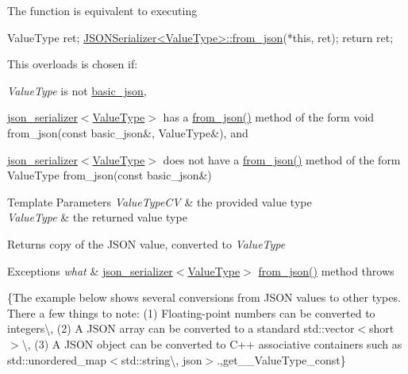 The function is equivalent to executing 
\begin{DoxyCode}
ValueType ret;
\hyperlink{namespacenlohmann_1_1anonymous__namespace_02from__json_8hpp_03_a8da2cbc27f4ff99aff5c20428fbcce4c}{JSONSerializer<ValueType>::from\_json}(*\textcolor{keyword}{this}, ret);
\textcolor{keywordflow}{return} ret;
\end{DoxyCode}


This overloads is chosen if\+:
\begin{DoxyItemize}
\item {\itshape Value\+Type} is not \hyperlink{classnlohmann_1_1basic__json}{basic\+\_\+json},
\item \hyperlink{classnlohmann_1_1basic__json_a7768841baaaa7a21098a401c932efaff}{json\+\_\+serializer$<$\+Value\+Type$>$} has a {\ttfamily \hyperlink{namespacenlohmann_1_1anonymous__namespace_02from__json_8hpp_03_a8da2cbc27f4ff99aff5c20428fbcce4c}{from\+\_\+json()}} method of the form {\ttfamily void from\+\_\+json(const basic\+\_\+json\&, Value\+Type\&)}, and
\item \hyperlink{classnlohmann_1_1basic__json_a7768841baaaa7a21098a401c932efaff}{json\+\_\+serializer$<$\+Value\+Type$>$} does not have a {\ttfamily \hyperlink{namespacenlohmann_1_1anonymous__namespace_02from__json_8hpp_03_a8da2cbc27f4ff99aff5c20428fbcce4c}{from\+\_\+json()}} method of the form {\ttfamily Value\+Type from\+\_\+json(const basic\+\_\+json\&)}
\end{DoxyItemize}


\begin{DoxyTemplParams}{Template Parameters}
{\em Value\+Type\+CV} & the provided value type \\
\hline
{\em Value\+Type} & the returned value type\\
\hline
\end{DoxyTemplParams}
\begin{DoxyReturn}{Returns}
copy of the J\+S\+ON value, converted to {\itshape Value\+Type} 
\end{DoxyReturn}

\begin{DoxyExceptions}{Exceptions}
{\em what} & \hyperlink{classnlohmann_1_1basic__json_a7768841baaaa7a21098a401c932efaff}{json\+\_\+serializer$<$\+Value\+Type$>$} {\ttfamily \hyperlink{namespacenlohmann_1_1anonymous__namespace_02from__json_8hpp_03_a8da2cbc27f4ff99aff5c20428fbcce4c}{from\+\_\+json()}} method throws\\
\hline
\end{DoxyExceptions}
\{The example below shows several conversions from J\+S\+ON values to other types. There a few things to note\+: (1) Floating-\/point numbers can be converted to integers\textbackslash{}, (2) A J\+S\+ON array can be converted to a standard {\ttfamily std\+::vector$<$short$>$}\textbackslash{}, (3) A J\+S\+ON object can be converted to C++ associative containers such as {\ttfamily std\+::unordered\+\_\+map$<$std\+::string\textbackslash{}, json$>$}.,get\+\_\+\+\_\+\+Value\+Type\+\_\+const\}


